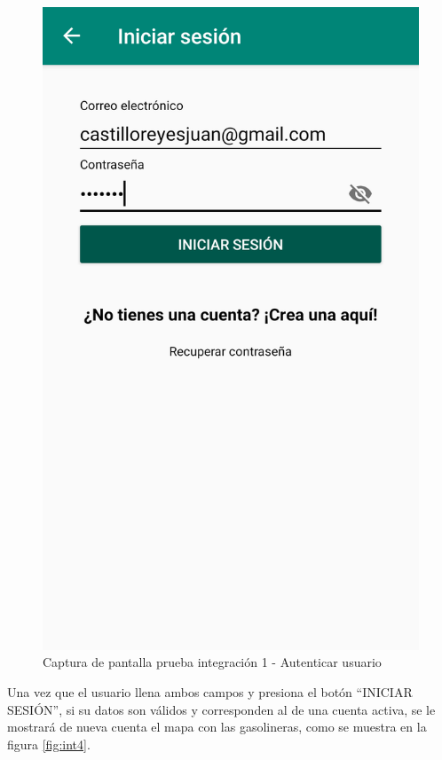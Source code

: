 \begin{figure}[H]
	\centering
	\includegraphics[scale=.2]{Capitulo6/integracion/software/images/3}
	\caption{Captura de pantalla prueba integración 1 - Autenticar usuario}
	\label{fig:int3}
\end{figure}

Una vez que el usuario llena ambos campos y presiona el botón ``INICIAR SESIÓN'', si su datos son válidos y corresponden al de una cuenta activa, se le mostrará de nueva cuenta el mapa con las gasolineras, como se muestra en la figura \ref{fig:int4}.


